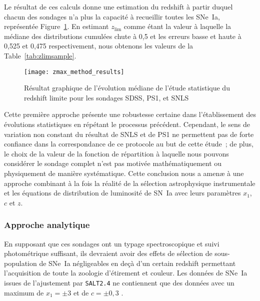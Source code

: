 \documentclass[../main/main.tex]{subfiles}
\begin{document}
Le résultat de ces calculs donne une estimation du redshift à partir duquel
chacun des sondages n'a plus la capacité à recueillir toutes les SNe~Ia,
représentée Figure~\ref{fig:zmax_method_results}. En estimant $z_{\lim}$ comme
étant la valeur à laquelle la médiane des distributions cumulées chute à 0,5 et
les erreurs basse et haute à 0,525 et 0,475 respectivement, nous obtenons les
valeurs de la Table~\ref{tab:zlimsample}.

\begin{figure}[ht]
    \centering
    \texttt{[image: zmax\_method\_results]}
    \captionsetup{justification=centering}
    \caption[Évolution médiane du redshift limite des sondages SDSS, PS1 et SNLS
    par approche statistique]{Résultat graphique de l'évolution médiane de
    l'étude statistique du redshift limite pour les sondages SDSS, PS1, et SNLS}
    \label{fig:zmax_method_results}
\end{figure}

Cette première approche présente une robustesse certaine dans l'établissement
des évolutions statistiques en répétant le processus précédent. Cependant, le
sens de variation non constant du résultat de SNLS et de PS1 ne permettent pas
de forte confiance dans la correspondance de ce protocole au but de cette
étude~; de plus, le choix de la valeur de la fonction de répartition à laquelle
nous pouvons considérer le sondage complet n'est pas motivée mathématiquement ou
physiquement de manière systématique. Cette conclusion nous a amenæ à une
approche combinant à la fois la réalité de la sélection astrophysique
instrumentale et les équations de distribution de luminosité de SN~Ia avec leurs
paramètres $x_1$, $c$ et $z$.

\subsubsection{Approche analytique}\label{sssec:maglim}

En supposant que ces sondages ont un typage spectroscopique et suivi
photométrique suffisant, ils devraient avoir des effets de sélection de
sous-population de SNe~Ia négligeables en deçà d'un certain redshift permettant
l'acquisition de toute la zoologie d'étirement et couleur. Les données de SNe~Ia
issues de l'ajustement par \texttt{SALT2.4} ne contiennent que des données avec
un maximum de $x_1 = \pm 3$ et de $c = \pm 0,3$ \citep[][cf
Section~\ref{ssec:salt}]{guy2007, betoule2014}.
\end{document}
